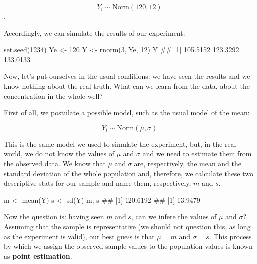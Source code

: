 \documentclass[a4paper,12pt,oneside]{book}
\newenvironment{Shaded}{\begin{snugshade}}{\end{snugshade}}
\newcommand{\DecValTok}[1]{#1}
\newcommand{\DocumentationTok}[1]{#1}
\newcommand{\OtherTok}[1]{#1}
\newcommand{\FunctionTok}[1]{#1}
\newcommand{\NormalTok}[1]{#1}
\begin{document}
\[Y_i \sim \textrm{Norm}(120, 12)\],

Accordingly, we can simulate the results of our experiment:

\begin{Shaded}
\begin{Highlighting}[]
\FunctionTok{set.seed}\NormalTok{(}\DecValTok{1234}\NormalTok{)}
\NormalTok{Ye }\OtherTok{\textless{}{-}} \DecValTok{120}
\NormalTok{Y }\OtherTok{\textless{}{-}} \FunctionTok{rnorm}\NormalTok{(}\DecValTok{3}\NormalTok{, Ye, }\DecValTok{12}\NormalTok{)}
\NormalTok{Y}
\DocumentationTok{\#\# [1] 105.5152 123.3292 133.0133}
\end{Highlighting}
\end{Shaded}

Now, let's put ourselves in the usual conditions: we have seen the results and we know nothing about the real truth. What can we learn from the data, about the concentration in the whole well?

First of all, we postulate a possible model, such as the usual model of the mean:

\[Y_i \sim \textrm{Norm}(\mu, \sigma)\]

This is the same model we used to simulate the experiment, but, in the real world, we do not know the values of \(\mu\) and \(\sigma\) and we need to estimate them from the observed data. We know that \(\mu\) and \(\sigma\) are, respectively, the mean and the standard deviation of the whole population and, therefore, we calculate these two descriptive stats for our sample and name them, respectively, \(m\) and \(s\).

\begin{Shaded}
\begin{Highlighting}[]
\NormalTok{m }\OtherTok{\textless{}{-}} \FunctionTok{mean}\NormalTok{(Y)}
\NormalTok{s }\OtherTok{\textless{}{-}} \FunctionTok{sd}\NormalTok{(Y)}
\NormalTok{m; s}
\DocumentationTok{\#\# [1] 120.6192}
\DocumentationTok{\#\# [1] 13.9479}
\end{Highlighting}
\end{Shaded}

Now the question is: having seen \(m\) and \(s\), can we infere the values of \(\mu\) and \(\sigma\)? Assuming that the sample is representative (we should not question this, as long as the experiment is valid), our best guess is that \(\mu = m\) and \(\sigma = s\). This process by which we assign the observed sample values to the population values is known as \textbf{point estimation}.
\end{document}
